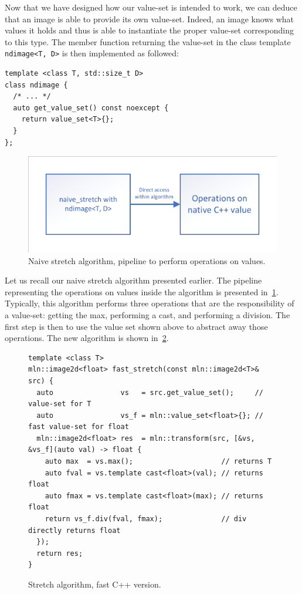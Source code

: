 Now that we have designed how our value-set is intended to work, we can deduce that an image is able to provide its own
value-set. Indeed, an image knows what values it holds and thus is able to instantiate the proper value-set
corresponding to this type. The member function returning the value-set in the class template \texttt{ndimage<T, D>} is
then implemented as followed:
\begin{verbatim}
template <class T, std::size_t D>
class ndimage {
  /* ... */
  auto get_value_set() const noexcept {
    return value_set<T>{};
  }
};
\end{verbatim}

\begin{figure}[htbp]
  \centering
  \includegraphics[width=.8\linewidth]{../figures/static_dynamic_bridge/naive_stretch}
  \caption{Naive stretch algorithm, pipeline to perform operations on values.}
  \label{fig:static_dyn.naive_stretch}
\end{figure}

Let us recall our naive stretch algorithm presented earlier. The pipeline representing the operations on values inside
the algorithm is presented in~\cref{fig:static_dyn.naive_stretch}. Typically, this algorithm performs three operations
that are the responsibility of a value-set: getting the max, performing a cast, and performing a division. The first
step is then to use the value set shown above to abstract away those operations. The new algorithm is shown
in~\cref{fig:stretch.fast.code}.

\begin{figure}[htbp]
  \begin{verbatim}
template <class T>
mln::image2d<float> fast_stretch(const mln::image2d<T>& src) {
  auto                vs   = src.get_value_set();     // value-set for T
  auto                vs_f = mln::value_set<float>{}; // fast value-set for float
  mln::image2d<float> res  = mln::transform(src, [&vs, &vs_f](auto val) -> float {
    auto max  = vs.max();                     // returns T
    auto fval = vs.template cast<float>(val); // returns float
    auto fmax = vs.template cast<float>(max); // returns float
    return vs_f.div(fval, fmax);              // div directly returns float
  });
  return res;
}
\end{verbatim}
  \caption{Stretch algorithm, fast C++ version.}
  \label{fig:stretch.fast.code}
\end{figure}


